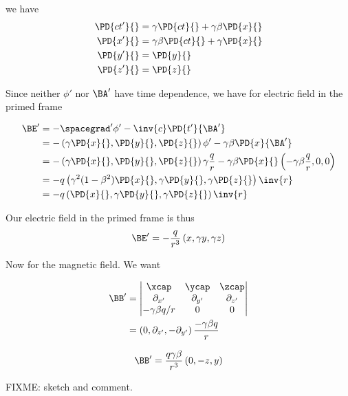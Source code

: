 we have
\begin{align}\label{eqn:relElectroDynProblemSet2:1050}
\PD{c t'}{} &= \gamma \PD{ct}{} + \gamma \beta \PD{x}{} \\
\PD{x'}{} &= \gamma \beta \PD{ct}{} + \gamma \PD{x}{} \\
\PD{y'}{} &= \PD{y}{} \\
\PD{z'}{} &= \PD{z}{}
\end{align}

Since neither $\phi'$ nor $\BA'$ have time dependence, we have for electric field in the primed frame

\begin{align*}
\BE' 
&= -\spacegrad' \phi' - \inv{c} \PD{t'}{\BA'} \\
&= 
-\left( \gamma \PD{x}{}, \PD{y}{}, \PD{z}{} \right) \phi'
- \gamma \beta \PD{x}{\BA'} \\
&= 
-\left( \gamma \PD{x}{}, \PD{y}{}, \PD{z}{} \right) \gamma \frac{q}{r}
- \gamma \beta \PD{x}{} \left( -\gamma \beta \frac{q}{r}, 0, 0 \right) \\
&= -q \left( \gamma^2 ( 1 - \beta^2 ) \PD{x}{}, \gamma \PD{y}{}, \gamma \PD{z}{} \right) \inv{r} \\
&= -q \left( \PD{x}{}, \gamma \PD{y}{}, \gamma \PD{z}{} \right) \inv{r}
\end{align*}

Our electric field in the primed frame is thus
\begin{equation}\label{eqn:relElectroDynProblemSet2:1070}
\BE' = -\frac{q}{r^3} \left( x, \gamma y, \gamma z \right) 
\end{equation}

Now for the magnetic field.  We want

\begin{align*}
\BB' 
&= 
\begin{vmatrix}
\xcap & \ycap & \zcap \\
\partial_{x'} & \partial_{y'} & \partial_{z'} \\
-\gamma \beta q/r & 0 & 0
\end{vmatrix} \\
&=
\left( 0, \partial_{z'}, -\partial_{y'} \right) \frac{-\gamma \beta q}{r} \\
\end{align*}

\begin{equation}\label{eqn:relElectroDynProblemSet2:1090}
\BB'
=
\frac{q \gamma \beta}{r^3} \left( 0, -z, y \right)
\end{equation}

FIXME: sketch and comment.

\EndNoBibArticle
